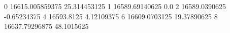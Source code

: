 0 16615.005859375 25.314453125
1 16589.69140625 0.0
2 16589.0390625 -0.65234375
4 16593.8125 4.12109375
6 16609.0703125 19.37890625
8 16637.79296875 48.1015625
